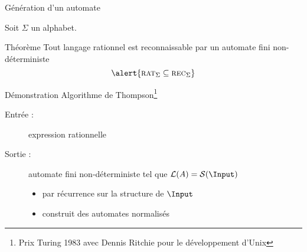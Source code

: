 
\begingroup

\begin{frame}{Génération d'un automate}
  
  Soit $\Sigma$ un alphabet.

  \begin{minipage}{8cm}
    \begin{block}{Théorème}
      Tout langage rationnel
      est reconnaissable par un automate fini non-déterministe
      $$ \alert{\textsc{rat}_\Sigma \subseteq  \textsc{rec}_\Sigma} $$
    \end{block}
  \end{minipage}
  \begin{block}{Démonstration}
    Algorithme de Thompson\footnote[frame]{Prix Turing 1983 avec Dennis Ritchie pour le développement d'Unix}
    \begin{description}
    \item [Entrée :] expression rationnelle 
    \item [Sortie :] automate fini non-déterministe  tel que $\mathcal{L}(A) = \mathcal{S}(\Input)$ 
      \begin{itemize}
      \item par récurrence sur la structure de $\Input$
      \item construit des automates \alert{normalisés}
      \end{itemize}
    \end{description}
  \end{block}


  
%    
\end{frame}
\endgroup
